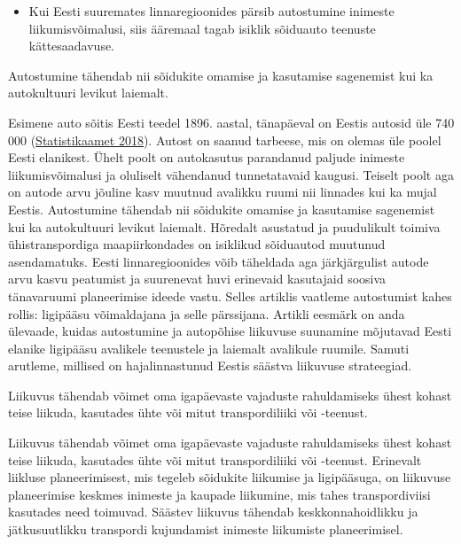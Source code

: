 \documentclass[estonian,]{article}
\providecommand{\tightlist}{%
  \setlength{\itemsep}{0pt}\setlength{\parskip}{0pt}}
\begin{document}
\begin{points}
\begin{itemize}
\tightlist
\item
  Kui Eesti suuremates linnaregioonides pärsib autostumine inimeste
  liikumisvõimalusi, siis ääremaal tagab isiklik sõiduauto teenuste
  kättesaadavuse.
\end{itemize}
\end{points}

\begin{blockquote-right}
Autostumine tähendab nii sõidukite omamise ja kasutamise sagenemist kui
ka autokultuuri levikut laiemalt.
\end{blockquote-right}

Esimene auto sõitis Eesti teedel 1896. aastal, tänapäeval on Eestis autosid üle 740 000 (\protect\hyperlink{Statistikaamet2018}{Statistikaamet 2018}). Autost on saanud tarbeese, mis on olemas üle poolel Eesti elanikest. Ühelt poolt on autokasutus parandanud paljude inimeste liikumisvõimalusi ja oluliselt vähendanud tunnetatavaid kaugusi. Teiselt poolt aga on autode arvu jõuline kasv muutnud avalikku ruumi nii linnades kui ka mujal Eestis. Autostumine tähendab nii sõidukite omamise ja kasutamise sagenemist kui ka autokultuuri levikut laiemalt. Hõredalt asustatud ja puudulikult toimiva ühistranspordiga maapiirkondades on isiklikud sõiduautod muutunud asendamatuks. Eesti linnaregioonides võib täheldada aga järkjärgulist autode arvu kasvu peatumist ja suurenevat huvi erinevaid kasutajaid soosiva tänavaruumi planeerimise ideede vastu. Selles artiklis vaatleme autostumist kahes rollis: ligipääsu võimaldajana ja selle pärssijana. Artikli eesmärk on anda ülevaade, kuidas autostumine ja autopõhise liikuvuse suunamine mõjutavad Eesti elanike ligipääsu avalikele teenustele ja laiemalt avalikule ruumile. Samuti arutleme, millised on hajalinnastunud Eestis säästva liikuvuse strateegiad.

\begin{blockquote-left}
Liikuvus tähendab võimet oma igapäevaste vajaduste rahuldamiseks ühest
kohast teise liikuda, kasutades ühte või mitut transpordiliiki või
-teenust.
\end{blockquote-left}

Liikuvus tähendab võimet oma igapäevaste vajaduste rahuldamiseks ühest kohast teise liikuda, kasutades ühte või mitut transpordiliiki või -teenust. Erinevalt liikluse planeerimisest, mis tegeleb sõidukite liikumise ja ligipääsuga, on liikuvuse planeerimise keskmes inimeste ja kaupade liikumine, mis tahes transpordiviisi kasutades need toimuvad. Säästev liikuvus tähendab keskkonnahoidlikku ja jätkusuutlikku transpordi kujundamist inimeste liikumiste planeerimisel.
\end{document}
